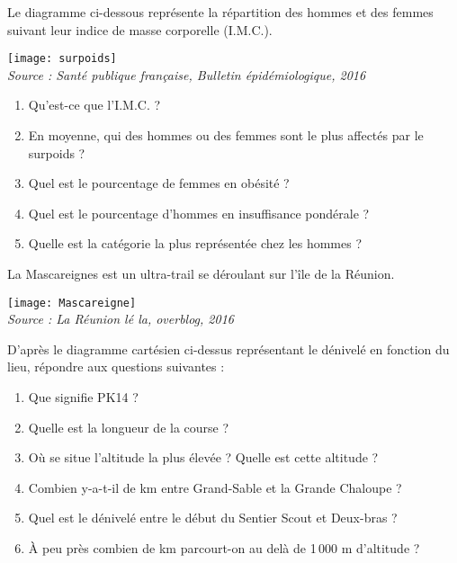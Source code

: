 \begin{colonne*exercice}
\begin{exercice} %
   Le diagramme ci-dessous représente la répartition des hommes et des femmes suivant leur indice de masse corporelle (I.M.C.).
   \begin{center}
      \texttt{[image: surpoids]} \\ [-2mm]
      \hfill {\scriptsize\it Source : Santé publique française, Bulletin épidémiologique, 2016}
   \end{center}
   \begin{enumerate}
      \item Qu'est-ce que l'I.M.C. ?
      \item En moyenne, qui des hommes ou des femmes sont le plus affectés par le surpoids ?
      \item Quel est le pourcentage de femmes en obésité ?
      \item Quel est le pourcentage d'hommes en insuffisance pondérale ?
      \item Quelle est la catégorie la plus représentée chez les hommes ?
   \end{enumerate}
\end{exercice}

\begin{exercice} %
   La Mascareignes est un ultra-trail se déroulant sur l'île de la Réunion.
   \begin{center}
      \texttt{[image: Mascareigne]} \\ 
      \hfill {\footnotesize\it Source : La Réunion lé la, overblog, 2016}
   \end{center}
   D'après le diagramme cartésien ci-dessus représentant le dénivelé en fonction du lieu, répondre aux questions suivantes :
   \begin{enumerate}
      \item Que signifie \og PK14 \fg ?
      \item Quelle est la longueur de la course ?
      \item Où se situe l'altitude la plus élevée ? Quelle est cette altitude ?
      \item Combien y-a-t-il de km entre Grand-Sable et la Grande Chaloupe ?
      \item Quel est le dénivelé entre le début du Sentier Scout et Deux-bras ?
      \item À peu près combien de km parcourt-on au delà de 1\,000 m d'altitude ?
   \end{enumerate}
\end{exercice}


\end{colonne*exercice}
